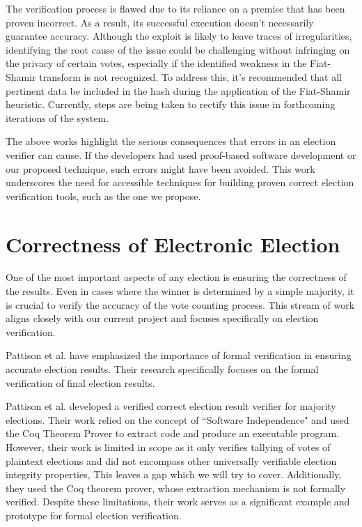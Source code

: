 The verification process is flawed due to its reliance on a premise that has been proven incorrect. As a result, its successful execution doesn't necessarily guarantee accuracy. Although the exploit is likely to leave traces of irregularities, identifying the root cause of the issue could be challenging without infringing on the privacy of certain votes, especially if the identified weakness in the Fiat-Shamir transform is not recognized. To address this, it's recommended that all pertinent data be included in the hash during the application of the Fiat-Shamir heuristic. Currently, steps are being taken to rectify this issue in forthcoming iterations of the system.

The above works highlight the serious consequences that errors in an election verifier can cause. If the developers had used proof-based software development or our proposed technique, such errors might have been avoided. This work underscores the need for accessible techniques for building proven correct election verification tools, such as the one we propose.

\section{Correctness of Electronic Election}
One of the most important aspects of any election is ensuring the correctness of the results. Even in cases where the winner is determined by a simple majority, it is crucial to verify the accuracy of the vote counting process. This stream of work aligns closely with our current project and focuses specifically on election verification.

Pattison et al. \cite{Pattinson2015VoteCA} have emphasized the importance of formal verification in ensuring accurate election results. Their research specifically focuses on the formal verification of final election results.

Pattison et al. \cite{Pattinson2015VoteCA} developed a verified correct election result verifier for majority elections. Their work relied on the concept of ``Software Independence" \cite{Rivest2008OnTN} and used the Coq Theorem Prover to extract code and produce an executable program. However, their work is limited in scope as it only verifies tallying of votes of plaintext elections and did not encompass other universally verifiable election integrity properties, This leaves a gap which we will try to cover. Additionally, they used the Coq theorem prover, whose extraction mechanism is not formally verified. Despite these limitations, their work serves as a significant example and prototype for formal election verification. 

